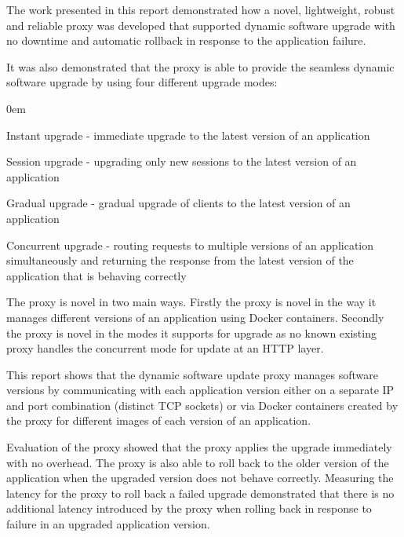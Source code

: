 \documentclass[a4paper,11pt,twoside]{report}
\begin{document}
The work presented in this report demonstrated how a novel, lightweight, robust and reliable proxy was developed that supported dynamic software upgrade with no downtime and automatic rollback in response to the application failure.


It was also demonstrated that the proxy is able to provide the seamless dynamic software upgrade by using four different upgrade modes:

       \begin{list}{-}{}

\itemsep0em

       \item{Instant upgrade} - immediate upgrade to the latest version of an application

               \item{Session upgrade} - upgrading only new sessions to the latest version of an application

               \item{Gradual upgrade} - gradual upgrade of clients to the latest version of an application

               \item{Concurrent upgrade} - routing requests to multiple versions of an application simultaneously and returning the response from the latest version of the application that is behaving correctly

               \end{list}


The proxy is novel in two main ways.  Firstly the proxy is novel in the way it manages different versions of an application using Docker containers.  Secondly the proxy is novel in the modes it supports for upgrade as no known existing proxy handles the concurrent mode for update at an HTTP layer.

This report shows that the dynamic software update proxy manages software versions by communicating with each application version either on a separate IP and port combination (distinct TCP sockets) or via Docker containers created by the proxy for different images of each version of an application.

Evaluation of the proxy showed that the proxy applies the upgrade immediately with no overhead. The proxy is also able to roll back to the older version of the application when the upgraded version does not behave correctly. Measuring the latency for the proxy to roll back a failed upgrade demonstrated that there is no additional latency introduced by the proxy when rolling back in response to failure in an upgraded application version.
\end{document}

